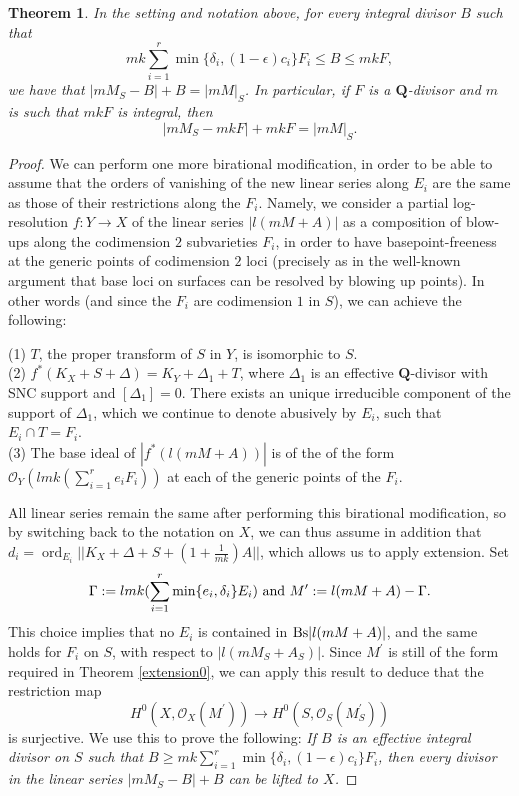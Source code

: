 \documentclass[11pt]{amsart}
\theoremstyle{plain}
\newtheorem{theorem}{Theorem}[section]
\theoremstyle{definition}
\newcommand{\noi}{\noindent}
\newcommand{\QQ}{\mathbf{Q}}
\newcommand{\OO}{\mathcal  {O}}
\DeclareMathOperator{\ord}{ord}
\begin{document}
\begin{theorem}\label{rational}
In the setting and notation above, for every integral divisor $B$ such that 
$$mk\sum_{i=1}^r \min \{\delta_i, (1-\epsilon)c_i\} F_i \le B \le mkF,$$
we have that $|mM_S - B| + B =  |mM|_S$.
In particular, if $F$ is a $\QQ$-divisor and $m$ is such that $mkF$ is integral, then
$$|mM_S - mkF| + mkF =  |mM|_S.$$
\end{theorem}
\begin{proof}
We can perform one more birational modification, in order to be able to assume that
the orders of vanishing of the new linear series along $E_i$ are the same as those 
of their restrictions along the $F_i$. Namely, we consider a partial log-resolution 
$f : Y \rightarrow X$ of the linear series $| l(mM+ A)|$ as a composition of blow-ups along the codimension $2$ subvarieties $F_i$, in order to have basepoint-freeness at the generic points of codimension $2$ loci (precisely 
as in the well-known argument that base loci on surfaces can be resolved by blowing up points).
In other words (and since the $F_i$ are codimension $1$ in $S$), we can achieve the following:

\noi
(1) $T$, the proper transform of $S$ in $Y$, is isomorphic to $S$.
\\
\noi
(2) $f^*(K_X+S+\Delta) = K_Y +\Delta_1 +T$,
where $\Delta_1$ is an effective $\QQ$-divisor with SNC support
and $[\Delta_1] =0$. There exists an unique irreducible component of the support
of $\Delta_1$, which we continue to denote abusively by $E_i$, such that 
$E_i \cap T = F_i$.
\\
\noi
(3) The  base ideal of $|f^*(l(mM+A))|$ is of the of the form
$\OO_Y (lmk(\sum_{i=1}^r e_i F_i))$ at each of the generic points of the $F_i$. 

All linear series remain the same after performing this birational modification, so by switching back to the notation on $X$, we can thus assume in addition that 
$d_i = \ord_{E_i} ||K_X+\Delta +S +(1+\frac{1}{mk})A||$, which allows us to apply extension. Set 
$$\Gamma : = lmk(\sum_{i=1}^r \min\{e_i, \delta_i\} E_i) 
{\rm ~and~} M^{\prime} := l (mM+ A) - \Gamma.$$
This choice implies that no $E_i$ is contained in ${\rm Bs} |l(mM+ A)|$, and the same holds for $F_i$ 
on $S$, with respect to $|l(mM_S + A_S)|$. Since $M^\prime$ is still of the form required in Theorem \ref{extension0}, we can apply this result to deduce that the restriction map
\begin{equation}\label{useful_extension}
H^0 (X, \OO_X(M^\prime)) \longrightarrow H^0 (S, \OO_S(M^\prime_S))
\end{equation}
is surjective. We use this to prove the following:
\emph{If $B$ is an effective integral divisor on $S$ such that 
$B \ge mk \sum_{i=1}^r \min \{\delta_i, (1-\epsilon)c_i\} F_i$, then every divisor 
in the linear series $|mM_S - B| +  B$ can be lifted to $X$.}


\end{proof}
\end{document}
